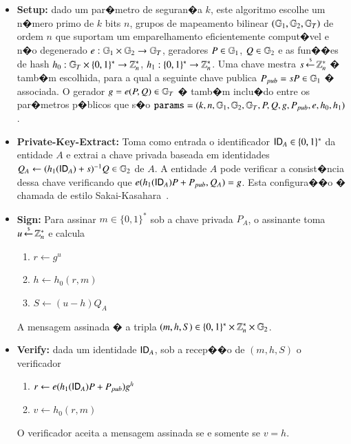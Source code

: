 \documentclass[a4paper,capchap,espacoduplo,normaltoc]{abntepusp}
\newcommand{\samples}{\mathop{\stackrel{\,_\$}{\gets}}}
\begin{document}
\begin{itemize}

\item \textbf{Setup:} dado um par�metro de seguran�a $k$, este algoritmo escolhe um n�mero primo de $k$ bits $n$, grupos de mapeamento bilinear $(\mathbb{G}_1,\mathbb{G}_2,\mathbb{G}_T)$  de ordem $n$ que suportam um emparelhamento eficientemente comput�vel e n�o degenerado $e: \mathbb{G}_1 \times \mathbb{G}_2 \rightarrow \mathbb{G}_T$, geradores $P \in \mathbb{G}_1$, $Q \in \mathbb{G}_2$ e as fun��es de hash $h_0: \mathbb{G}_T \times \{0, 1\}^\ast \rightarrow \mathbb{Z}_n^\ast$,
$h_1: \{0, 1\}^\ast \rightarrow \mathbb{Z}_n^\ast$.
Uma chave mestra $s \samples \Z_n^\ast$ � tamb�m escolhida, para a qual a seguinte chave publica $P_{pub} = sP \in \mathbb{G}_1$ � associada. O gerador $g = e(P, Q) \in \mathbb{G}_T$ � tamb�m inclu�do entre os par�metros p�blicos que s�o $\texttt{params} = (k, n, \mathbb{G}_1, \mathbb{G}_2, \mathbb{G}_T, P, Q, g, P_{pub}, e, h_0, h_1)$.

\item \textbf{Private-Key-Extract:} Toma como entrada o identificador $\mathsf{ID}_A \in \{0, 1\}^\ast$ da entidade $A$ e extrai a chave privada baseada em identidades $Q_A \gets (h_1(\mathsf{ID}_A) + s)^{-1}Q \in \mathbb{G}_2$ de $A$. A entidade $A$ pode verificar a consist�ncia dessa chave verificando que $e(h_1(\mathsf{ID}_A) P + P_{pub}, Q_A) = g$. Esta configura��o � chamada de estilo Sakai-Kasahara~\cite{sakai-kasahara}.

\item \textbf{Sign:} Para assinar $m \in \{0, 1\}^\ast$ sob a chave privada  $P_A$, o assinante toma $u \samples \Z_n^\ast$ e calcula
\begin{enumerate}
\item $r \gets g^u$
\item $h \gets h_0(r, m)$
\item $S \gets (u - h) Q_A$
\end{enumerate}
A mensagem assinada � a tripla $(m, h, S) \in \{0, 1\}^\ast \times \mathbb{Z}_n^\ast \times \mathbb{G}_2$.

\item \textbf{Verify:} dada um identidade $\mathsf{ID}_A$, sob a recep��o de $(m, h, S)$ o verificador
\begin{enumerate}
\item $r \gets e(h_1(\mathsf{ID}_A) P + P_{pub}) g^h$
\item $v \gets h_0(r, m)$
\end{enumerate}
O verificador aceita a mensagem assinada se e somente se $v = h$.

\end{itemize}
\end{document}
